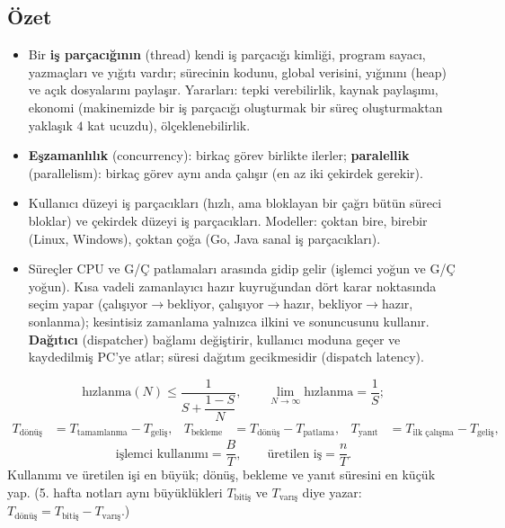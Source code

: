 \documentclass[11pt,a4paper]{article}
\newcommand{\term}[1]{\textbf{\color{mintdeep}#1}}
\begin{document}
\subsection*{Özet}
\begin{itemize}
  \item Bir \term{iş parçacığının} (thread) kendi iş parçacığı kimliği, program sayacı, yazmaçları ve yığıtı vardır; sürecinin kodunu, global verisini, yığınını (heap) ve açık dosyalarını paylaşır. Yararları: tepki verebilirlik, kaynak paylaşımı, ekonomi (makinemizde bir iş parçacığı oluşturmak bir süreç oluşturmaktan yaklaşık $4$ kat ucuzdu), ölçeklenebilirlik.
  \item \term{Eşzamanlılık} (concurrency): birkaç görev birlikte ilerler; \term{paralellik} (parallelism): birkaç görev aynı anda çalışır (en az iki çekirdek gerekir).
  \item Kullanıcı düzeyi iş parçacıkları (hızlı, ama bloklayan bir çağrı bütün süreci bloklar) ve çekirdek düzeyi iş parçacıkları. Modeller: çoktan bire, birebir (Linux, Windows), çoktan çoğa (Go, Java sanal iş parçacıkları).
  \item Süreçler CPU ve G/Ç patlamaları arasında gidip gelir (işlemci yoğun ve G/Ç yoğun). Kısa vadeli zamanlayıcı hazır kuyruğundan dört karar noktasında seçim yapar (çalışıyor$\to$bekliyor, çalışıyor$\to$hazır, bekliyor$\to$hazır, sonlanma); kesintisiz zamanlama yalnızca ilkini ve sonuncusunu kullanır. \term{Dağıtıcı} (dispatcher) bağlamı değiştirir, kullanıcı moduna geçer ve kaydedilmiş PC'ye atlar; süresi dağıtım gecikmesidir (dispatch latency).
\end{itemize}

\begin{keyidea}
\[
\text{hızlanma}(N) \le \frac{1}{S + \dfrac{1-S}{N}}, \qquad \lim_{N\to\infty} \text{hızlanma} = \frac{1}{S};
\]
\begin{align*}
T_{\text{dönüş}} &= T_{\text{tamamlanma}} - T_{\text{geliş}}, &
T_{\text{bekleme}} &= T_{\text{dönüş}} - T_{\text{patlama}}, &
T_{\text{yanıt}} &= T_{\text{ilk çalışma}} - T_{\text{geliş}},
\end{align*}
\[
\text{işlemci kullanımı} = \frac{B}{T}, \qquad \text{üretilen iş} = \frac{n}{T}.
\]
Kullanımı ve üretilen işi en büyük; dönüş, bekleme ve yanıt süresini en küçük yap. (5. hafta notları aynı büyüklükleri $T_{\text{bitiş}}$ ve $T_{\text{varış}}$ diye yazar: $T_{\text{dönüş}} = T_{\text{bitiş}} - T_{\text{varış}}$.)
\end{keyidea}
\end{document}
